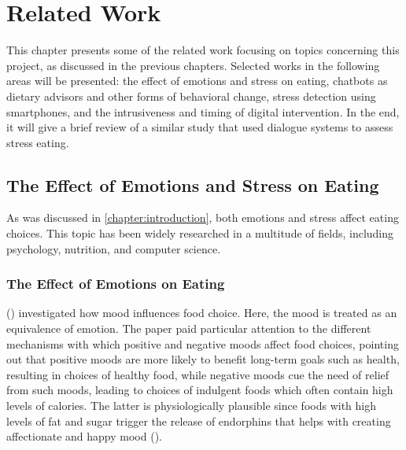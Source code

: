 
\chapter{Related Work}\label{chapter:related_work}
This chapter presents some of the related work focusing on topics concerning this project, as discussed in the previous chapters. Selected works in the following areas will be presented: the effect of emotions and stress on eating, chatbots as dietary advisors and other forms of behavioral change, stress detection using smartphones, and the intrusiveness and timing of digital intervention. In the end, it will give a brief review of a similar study that used dialogue systems to assess stress eating.

\section{The Effect of Emotions and Stress on Eating}
As was discussed in \autoref{chapter:introduction}, both emotions and stress affect eating choices. This topic has been widely researched in a multitude of fields, including psychology, nutrition, and computer science.

\subsection{The Effect of Emotions on Eating}
\citeauthor{4_mood_eat} (\citeyear{4_mood_eat}) investigated how mood influences food choice. Here, the mood is treated as an equivalence of emotion. The paper paid particular attention to the different mechanisms with which positive and negative moods affect food choices, pointing out that positive moods are more likely to benefit long-term goals such as health, resulting in choices of healthy food, while negative moods cue the need of relief from such moods, leading to choices of indulgent foods which often contain high levels of calories. The latter is physiologically plausible since foods with high levels of fat and sugar trigger the release of endorphins that helps with creating affectionate and happy mood (\cite{32_endorphins}).\bigskip

